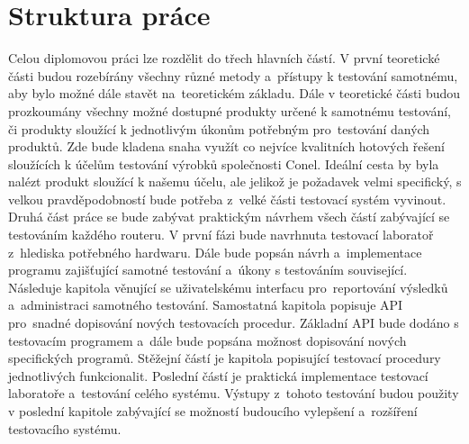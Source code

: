 \section{Struktura práce}
Celou diplomovou práci lze rozdělit do třech hlavních částí. V první teoretické části budou rozebírány všechny různé metody a~přístupy k testování samotnému, aby bylo možné dále stavět na~teoretickém základu. Dále v teoretické části budou prozkoumány všechny možné dostupné produkty určené k samotnému testování, či produkty sloužící k jednotlivým úkonům potřebným pro~testování daných produktů. Zde bude kladena snaha využít co nejvíce kvalitních hotových řešení sloužících k účelům testování výrobků společnosti Conel. Ideální cesta by byla nalézt produkt sloužící k našemu účelu, ale jelikož je požadavek velmi specifický, s velkou pravděpodobností bude potřeba z~velké části testovací systém vyvinout. Druhá část práce se bude zabývat praktickým návrhem všech částí zabývající se testováním každého routeru. V první fázi bude navrhnuta testovací laboratoř z~hlediska potřebného hardwaru. Dále bude popsán návrh a~implementace programu zajišťující samotné testování a~úkony s testováním související. Následuje kapitola věnující se uživatelskému interfacu pro~reportování výsledků a~administraci samotného testování. Samostatná kapitola popisuje API pro~snadné dopisování nových testovacích procedur. Základní API bude dodáno s testovacím programem a~dále bude popsána možnost dopisování nových specifických programů. Stěžejní částí je kapitola popisující testovací procedury jednotlivých funkcionalit. Poslední částí je praktická implementace testovací laboratoře a~testování celého systému. Výstupy z~tohoto testování budou použity v poslední kapitole zabývající se možností budoucího vylepšení a~rozšíření testovacího systému.

\endinput
